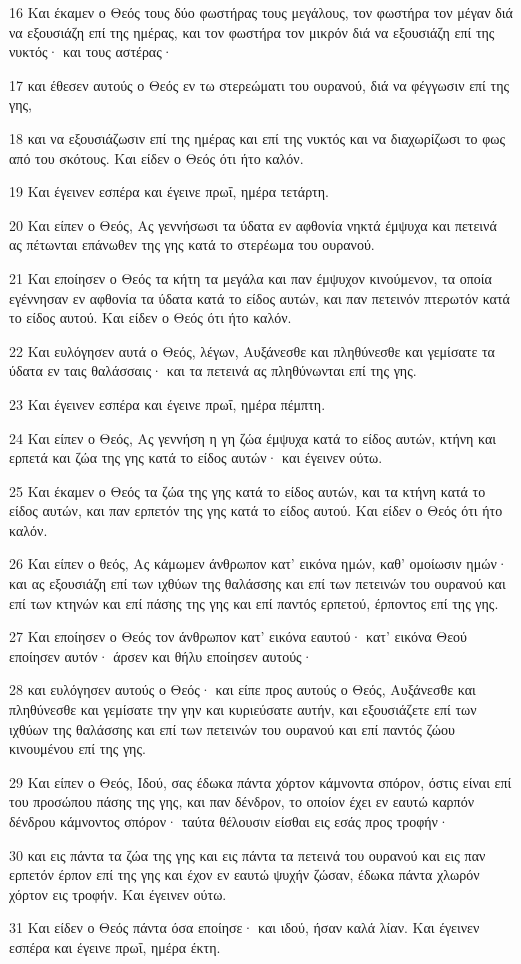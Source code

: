 \par 16 Και έκαμεν ο Θεός τους δύο φωστήρας τους μεγάλους, τον φωστήρα τον μέγαν διά να εξουσιάζη επί της ημέρας, και τον φωστήρα τον μικρόν διά να εξουσιάζη επί της νυκτός· και τους αστέρας·
\par 17 και έθεσεν αυτούς ο Θεός εν τω στερεώματι του ουρανού, διά να φέγγωσιν επί της γης,
\par 18 και να εξουσιάζωσιν επί της ημέρας και επί της νυκτός και να διαχωρίζωσι το φως από του σκότους. Και είδεν ο Θεός ότι ήτο καλόν.
\par 19 Και έγεινεν εσπέρα και έγεινε πρωΐ, ημέρα τετάρτη.
\par 20 Και είπεν ο Θεός, Ας γεννήσωσι τα ύδατα εν αφθονία νηκτά έμψυχα και πετεινά ας πέτωνται επάνωθεν της γης κατά το στερέωμα του ουρανού.
\par 21 Και εποίησεν ο Θεός τα κήτη τα μεγάλα και παν έμψυχον κινούμενον, τα οποία εγέννησαν εν αφθονία τα ύδατα κατά το είδος αυτών, και παν πετεινόν πτερωτόν κατά το είδος αυτού. Και είδεν ο Θεός ότι ήτο καλόν.
\par 22 Και ευλόγησεν αυτά ο Θεός, λέγων, Αυξάνεσθε και πληθύνεσθε και γεμίσατε τα ύδατα εν ταις θαλάσσαις· και τα πετεινά ας πληθύνωνται επί της γης.
\par 23 Και έγεινεν εσπέρα και έγεινε πρωΐ, ημέρα πέμπτη.
\par 24 Και είπεν ο Θεός, Ας γεννήση η γη ζώα έμψυχα κατά το είδος αυτών, κτήνη και ερπετά και ζώα της γης κατά το είδος αυτών· και έγεινεν ούτω.
\par 25 Και έκαμεν ο Θεός τα ζώα της γης κατά το είδος αυτών, και τα κτήνη κατά το είδος αυτών, και παν ερπετόν της γης κατά το είδος αυτού. Και είδεν ο Θεός ότι ήτο καλόν.
\par 26 Και είπεν ο θεός, Ας κάμωμεν άνθρωπον κατ' εικόνα ημών, καθ' ομοίωσιν ημών· και ας εξουσιάζη επί των ιχθύων της θαλάσσης και επί των πετεινών του ουρανού και επί των κτηνών και επί πάσης της γης και επί παντός ερπετού, έρποντος επί της γης.
\par 27 Και εποίησεν ο Θεός τον άνθρωπον κατ' εικόνα εαυτού· κατ' εικόνα Θεού εποίησεν αυτόν· άρσεν και θήλυ εποίησεν αυτούς·
\par 28 και ευλόγησεν αυτούς ο Θεός· και είπε προς αυτούς ο Θεός, Αυξάνεσθε και πληθύνεσθε και γεμίσατε την γην και κυριεύσατε αυτήν, και εξουσιάζετε επί των ιχθύων της θαλάσσης και επί των πετεινών του ουρανού και επί παντός ζώου κινουμένου επί της γης.
\par 29 Και είπεν ο Θεός, Ιδού, σας έδωκα πάντα χόρτον κάμνοντα σπόρον, όστις είναι επί του προσώπου πάσης της γης, και παν δένδρον, το οποίον έχει εν εαυτώ καρπόν δένδρου κάμνοντος σπόρον· ταύτα θέλουσιν είσθαι εις εσάς προς τροφήν·
\par 30 και εις πάντα τα ζώα της γης και εις πάντα τα πετεινά του ουρανού και εις παν ερπετόν έρπον επί της γης και έχον εν εαυτώ ψυχήν ζώσαν, έδωκα πάντα χλωρόν χόρτον εις τροφήν. Και έγεινεν ούτω.
\par 31 Και είδεν ο Θεός πάντα όσα εποίησε· και ιδού, ήσαν καλά λίαν. Και έγεινεν εσπέρα και έγεινε πρωΐ, ημέρα έκτη.

